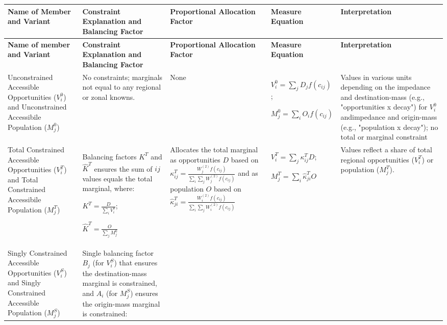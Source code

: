 {\tiny
\begin{longtable}{|p{2.5cm}|p{2.5cm}|p{2.5cm}|p{3cm}|p{3cm}|}
\hline
\textbf{Name of Member and Variant} & \textbf{Constraint Explanation and Balancing Factor} & \textbf{Proportional Allocation Factor} & \textbf{Measure Equation} & \textbf{Interpretation} \\
\hline
\endfirsthead

\hline
\textbf{Name of member and Variant} & \textbf{Constraint Explanation and Balancing Factor} & \textbf{Proportional Allocation Factor} & \textbf{Measure Equation} & \textbf{Interpretation} \\
\hline
\endhead

Unconstrained Accessible Opportunities ($V_i^0$) and Unconstrained Accessibile Population ($M_j^0$)
& No constraints; marginals not equal to any regional or zonal knowns.
& None
& $V_i^0 = \sum_j D_j f(c_{ij})$;

$M_j^0 = \sum_i O_i f(c_{ij})$

& Values in various units depending on the impedance and destination-mass (e.g., "opportunities x decay") for $V_i^0$ andimpedance and origin-mass (e.g., "population x decay"); no total or marginal constraint \\
\hline

Total Constrained Accessible Opportunities ($V_i^T$) and Total Constrained Accessibile Population ($M_j^T$)
& Balancing factors $K^T$ and $\hat{K}^T$ ensures the sum of $ij$ values equals the total marginal, where:

$K^T = \frac{D}{\sum_i V_i^0}$;

$\hat{K}^T = \frac{O}{\sum_j M_j^0}$

& Allocates the total marginal as opportunities $D$ based on $\kappa_{ij}^T = \frac{W^{(2)}_j f(c_{ij})}{\sum_i\sum_j W^{(2)}_jf(c_{ij})}$ and as population $O$ based on $\hat \kappa_{ji}^T = \frac{W^{(2)}_i  f(c_{ij})}{\sum_i\sum_j W^{(2)}_if(c_{ij})}$

& $V^T_i =  \sum_j \kappa_{ij}^T D$;

$M_j^T =  \sum_i \hat{\kappa}_{ji}^T O$


& Values reflect a share of total regional opportunities ($V^T_i$) or population ($M^T_j$). \\
\hline

Singly Constrained Accessible Opportunities ($V_i^S$) and Singly Constrained Accessible Population ($M_j^S$)
& Single balancing factor $B_j$ (for $V_i^S$) that ensures the destination-mass marginal is constrained, and $A_i$ (for $M_j^S$) ensures the origin-mass marginal is constrained:


\end{longtable}}
